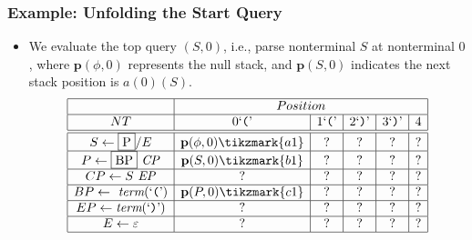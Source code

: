 \documentclass[xcolor=dvipsnames]{beamer}
\begin{document}
\begin{frame}[fragile]
\frametitle{Example: Unfolding the Start Query}
\begin{itemize}
\item We evaluate the top query $(S, 0)$, i.e., parse nonterminal $S$ at nonterminal $0$, where
$\mathbf{p}(\phi, 0)$ represents the null stack, and $\mathbf{p}(S, 0)$ indicates the next stack position is $a(0)(S)$\@.  
$$
\begin{array}[c]{|c|c|c|c|c|c|}\hline
  & \multicolumn{5}{c|}{Position} \\\hline
NT  & 0 \mbox{\lq\texttt{(}\rq}& 1 \mbox{\lq\texttt{(}\rq}& 2 \mbox{\lq\texttt{)}\rq}& 3 \mbox{\lq\texttt{)}\rq} & 4 \\\hline\hline
S \leftarrow  \fbox{P} / E &  \mathbf{p}(\phi, 0)\tikzmark{a1} & ? & ? & ? & ? \\\hline
  P \leftarrow  \mathit{\fbox{BP}}~\mathit{CP}    &  \mathbf{p}(S, 0)\tikzmark{b1} & ? & ? & ? & ? \\\hline
  CP \leftarrow  S~\mathit{EP} &  ? & ? & ? & ? & ? \\\hline
  BP \leftarrow \textit{ term}(\mbox{\lq\texttt{(}\rq}) &  \mathbf{p}(P, 0)\tikzmark{c1} & ? & ? & ? & ? \\\hline
  EP \leftarrow  \textit{term}(\mbox{\lq\texttt{)}\rq}) &  ? & ? & ? & ? & ? \\\hline
  E \leftarrow  \varepsilon  & ? & ? & ? & ? & ? \\\hline    
\end{array}
$$
\end{itemize}
\end{frame}
\end{document}
